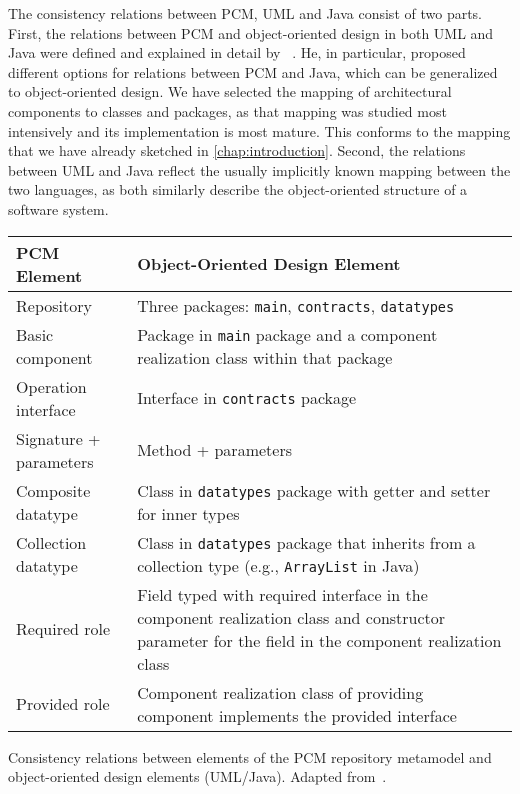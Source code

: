 The consistency relations between \gls{PCM}, \gls{UML} and Java consist of two parts.
First, the relations between \gls{PCM} and object-oriented design in both \gls{UML} and Java were defined and explained in detail by \citeauthor{langhammer2017a}~\cite{langhammer2015a, langhammer2017a}.
He, in particular, proposed different options for relations between \gls{PCM} and Java, which can be generalized to object-oriented design.
We have selected the mapping of architectural components to classes and packages, as that mapping was studied most intensively and its implementation is most mature.
This conforms to the mapping that we have already sketched in \autoref{chap:introduction}.
Second, the relations between \gls{UML} and Java reflect the usually implicitly known mapping between the two languages, as both similarly describe the object-oriented structure of a software system.

\begin{propertable}
	\begin{tabular}{p{10em} p{\increasetoafour{21em}}}
		\toprule
        \textbf{\gls{PCM} Element}  & \textbf{Object-Oriented Design Element} \\
        \midrule
		Repository              & Three packages: \texttt{main}, \texttt{contracts}, \texttt{datatypes} \\
		Basic component 	    & Package in \texttt{main} package and a component realization class within that package \\
		Operation interface		& Interface in \texttt{contracts} package \\
		Signature + parameters  & Method + parameters \\
		Composite datatype      & Class in \texttt{datatypes} package with getter and setter for inner types\\
		Collection datatype     & Class in \texttt{datatypes} package that inherits from a collection type \newline (e.g., \texttt{ArrayList} in Java) \\
		Required role		    & Field typed with required interface in the component realization class and constructor parameter for the field in the component realization class\\
		Provided role		    & Component realization class of providing component implements the provided interface\\
		\bottomrule
	\end{tabular}
	\caption[Consistency relations between \acrshort{PCM} and \acrshort{UML}/Java]{Consistency relations between elements of the \gls{PCM} repository metamodel and object-oriented design elements (\gls{UML}/Java). Adapted from~\cite[Tab.~4.1]{langhammer2017a}.}
	\label{tab:foundations:pcm_oo_rules}
\end{propertable}

